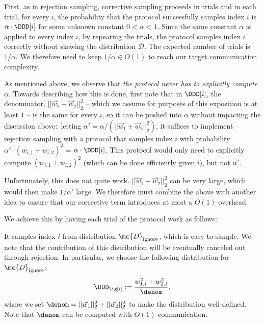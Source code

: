 First, as in rejection sampling, corrective
sampling proceeds in trials and
in each trial, for every $i$, the probability that the protocol
successfully samples index $i$ is $\alpha \cdot \DDD[i]$ for some unknown constant $0 <
\alpha < 1$. 
Since the same constant $\alpha$ is applied to every index $i$, by
repeating the trials, the protocol samples index $i$ correctly without
skewing the distribution $\mathcal{D}$. The expected number of trials is
$1/\alpha$. We therefore need to keep $1/\alpha \in {O}(1)$ to reach our target communication complexity.

As mentioned above, we observe that {\em the protocol never has to
explicitly compute $\alpha$}. Towards describing how this is done, first note that in $\DDD[i]$, the
denominator, $||\vec{w}_1 + \vec{w}_2||_2^2$ -- which we assume for purposes of this exposition is at least $1$ -- is the same for every $i$,
so it can be pushed into $\alpha$ without 
impacting the discussion above:~letting 
 $\alpha' = \alpha/(||\vec{w}_1 + \vec{w}_2||_2^2)$, it suffices to implement rejection sampling with a protocol that samples index $i$ with probability 
$\alpha'\cdot (w_{i,1} + w_{i,2})^2$ = $\alpha \cdot \DDD[i]$.
This protocol would only need to explicitly compute 
$(w_{i,1} + w_{i,2})^2$ (which can be done efficiently
given $i$), but not $\alpha'$.

Unfortunately, this does not quite work.
$||\vec{w}_1 + \vec{w}_2||_2^2$ can be very large, which would then
make $1/\alpha'$ large. We therefore must combine the above with another idea to ensure that our corrective term introduces at most a ${O}(1)$ overhead. 

We achieve this by having each trial of the protocol work as follows:
\BEN
\item It samples index $i$ from distribution
$\mc{D}_{\mathrm{ignore}}$, which is easy to sample. We note that the contribution of this distribution will be eventually
canceled out through rejection.  In particular, we choose the following distribution for
$\mc{D}_{\mathrm{ignore}}$:
$$\DDD_\ig[i] := \frac{w^2_{1,i} + w^2_{2,i}}{\denom},$$
where we set $\denom = ||\vec{w}_1||_2^2 + ||\vec{w}_2||_2^2$ to make
the distribution well-defined.  Note that $\denom$ can be computed with $\tilde O(1)$ communication.

